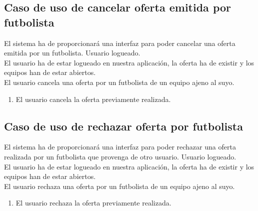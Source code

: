 \subsection{Caso de uso de cancelar oferta emitida por futbolista}
 El sistema ha de proporcionará una interfaz para poder
cancelar una oferta emitida por un futbolista.
 Usuario logueado. \\
 El usuario ha de estar logueado en nuestra aplicación,
la oferta ha de existir y los equipos han de estar
abiertos. \\
 El usuario cancela una oferta por un futbolista de un
equipo ajeno al suyo.  
\begin{enumerate}
\item El usuario cancela la oferta previamente realizada.
\end{enumerate}

\subsection{Caso de uso de rechazar oferta por futbolista}
 El sistema ha de proporcionará una interfaz para poder
rechazar una oferta realizada por un futbolista que provenga de otro usuario.
 Usuario logueado. \\
 El usuario ha de estar logueado en nuestra aplicación,
la oferta ha de existir y los equipos han de estar
abiertos. \\
 El usuario rechaza una oferta por un futbolista de un
equipo ajeno al suyo.  
\begin{enumerate}
\item El usuario rechaza la oferta previamente realizada.
\end{enumerate}

